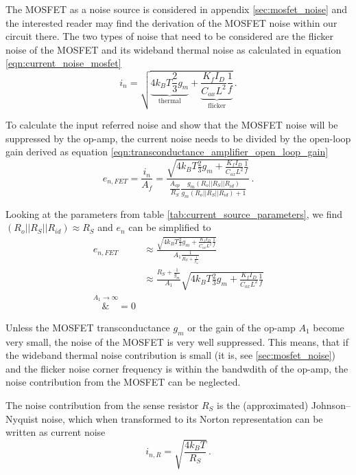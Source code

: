 The MOSFET as a noise source is considered in appendix \ref{sec:mosfet_noise} and the interested reader may find the derivation of the MOSFET noise within our circuit there. The two types of noise that need to be considered are the flicker noise of the MOSFET and its wideband thermal noise as calculated in equation \ref{eqn:current_noise_mosfet}
\begin{equation}
    i_{n} = \sqrt{\underbrace{4 k_B T \frac{2}{3} g_m}_{\text{thermal}} + \underbrace{\frac{K_f I_D}{C_{ox} L^2} \frac{1}{f}}_{\text{flicker}}} \,.\nonumber
\end{equation}

To calculate the input referred noise and show that the MOSFET noise will be suppressed by the op-amp, the current noise needs to be divided by the open-loop gain derived as equation \ref{eqn:transconductance_amplifier_open_loop_gain}
\begin{equation}
    e_{n,FET} = \frac{i_n}{A_f} = \frac{\sqrt{4 k_B T \frac{2}{3} g_m + \frac{K_f I_D}{C_{ox} L^2} \frac{1}{f}}}{\frac{A_{op}}{R_S} \frac{g_m \left(R_o || R_S || R_{id}\right)}{g_m \left(R_o || R_S || R_{id}\right) + 1}} \,.
\end{equation}

Looking at the parameters from table \ref{tab:current_source_parameters}, we find $\left(R_o || R_S || R_{id}\right) \approx R_S$ and $e_n$ can be simplified to
\begin{align}
    e_{n,FET} &\approx \frac{\sqrt{4 k_B T \frac{2}{3} g_m + \frac{K_f I_D}{C_{ox} L^2} \frac{1}{f}}}{A_1 \frac{1}{R_S + \frac{1}{g_m}}} \nonumber\\
    &\approx \frac{R_S + \frac{1}{g_m}}{A_1} \sqrt{4 k_B T \frac{2}{3} g_m + \frac{K_f I_D}{C_{ox} L^2} \frac{1}{f}} \nonumber\\
    \overset{A_1 \to \infty}&{=} 0\nonumber
\end{align}

Unless the MOSFET transconductance $g_m$ or the gain of the op-amp $A_1$ become very small, the noise of the MOSFET is very well suppressed. This means, that if the wideband thermal noise contribution is small (it is, see \ref{sec:mosfet_noise}) and the flicker noise corner frequency is within the bandwdith of the op-amp, the noise contribution from the MOSFET can be neglected.

The noise contribution from the sense resistor $R_S$ is the (approximated) Johnson–Nyquist noise, which when transformed to its Norton representation can be written as current noise
\begin{equation}
    i_{n,R} = \sqrt{\frac{4 k_B T}{R_S}} \,.
\end{equation}

